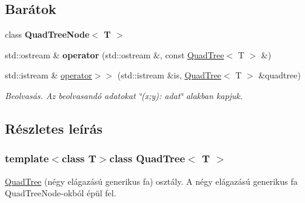 \subsection*{Barátok}
\begin{DoxyCompactItemize}
\item 
\hypertarget{class_quad_tree_ac17a5caf43217c772028859f0dd9036e}{class {\bfseries Quad\-Tree\-Node$<$ T $>$}}\label{class_quad_tree_ac17a5caf43217c772028859f0dd9036e}

\item 
\hypertarget{class_quad_tree_a1064006fe4acbdff14ffa84b3a22e774}{std\-::ostream \& {\bfseries operator} (std\-::ostream \&, const \hyperlink{class_quad_tree}{Quad\-Tree}$<$ T $>$ \&)}\label{class_quad_tree_a1064006fe4acbdff14ffa84b3a22e774}

\item 
\hypertarget{class_quad_tree_a60cfb0948b744f2d7ba51d75ad8f28ea}{std\-::istream \& \hyperlink{class_quad_tree_a60cfb0948b744f2d7ba51d75ad8f28ea}{operator$>$$>$} (std\-::istream \&is, \hyperlink{class_quad_tree}{Quad\-Tree}$<$ T $>$ \&quadtree)}\label{class_quad_tree_a60cfb0948b744f2d7ba51d75ad8f28ea}

\begin{DoxyCompactList}\small\item\em Beolvasás. Az beolvasandó adatokat \char`\"{}(x;y)\-: adat\char`\"{} alakban kapjuk. \end{DoxyCompactList}\end{DoxyCompactItemize}


\subsection{Részletes leírás}
\subsubsection*{template$<$class T$>$class Quad\-Tree$<$ T $>$}

\hyperlink{class_quad_tree}{Quad\-Tree} (négy elágazású generikus fa) osztály. A négy elágazású generikus fa Quad\-Tree\-Node-\/okból épül fel. 

